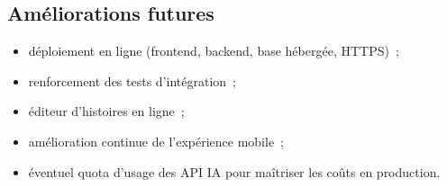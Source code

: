 \documentclass[12pt,twoside,letterpaper]{article}
\begin{document}
\subsection{Améliorations futures}
\begin{itemize}
    \item déploiement en ligne (frontend, backend, base hébergée, HTTPS)~;
    \item renforcement des tests d'intégration~;
    \item éditeur d'histoires en ligne~;
    \item amélioration continue de l'expérience mobile~;
    \item éventuel quota d'usage des API IA pour maîtriser les coûts en production.
\end{itemize}

\newpage

\end{document}
